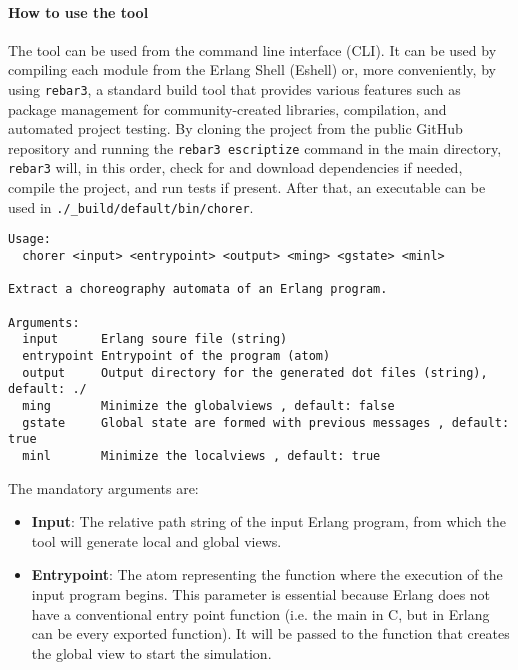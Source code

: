 
\paragraph{How to use the tool}
The tool can be used from the command line interface (CLI). It can be used by compiling each module from the Erlang Shell (Eshell) or, more conveniently, by using \texttt{rebar3}, a standard build tool that provides various features such as package management for community-created libraries, compilation, and automated project testing. By cloning the project from the public GitHub repository and running the \texttt{rebar3 escriptize} command in the main directory, \texttt{rebar3} will, in this order, check for and download dependencies if needed, compile the project, and run tests if present. After that, an executable can be used in \texttt{./\_build/default/bin/chorer}.

\begin{lstlisting}[caption=Usage message]
Usage:
  chorer <input> <entrypoint> <output> <ming> <gstate> <minl>

Extract a choreography automata of an Erlang program.

Arguments:
  input      Erlang soure file (string)
  entrypoint Entrypoint of the program (atom)
  output     Output directory for the generated dot files (string), default: ./
  ming       Minimize the globalviews , default: false
  gstate     Global state are formed with previous messages , default: true
  minl       Minimize the localviews , default: true
\end{lstlisting}

\noindent The mandatory arguments are:
\begin{itemize}
    \item \textbf{Input}: The relative path string of the input Erlang program, from which the tool will generate local and global views.
    \item \textbf{Entrypoint}: The atom representing the function where the execution of the input program begins. This parameter is essential because Erlang does not have a conventional entry point function (i.e. the main in C, but in Erlang can be every exported function). It will be passed to the function that creates the global view to start the simulation.
\end{itemize}

